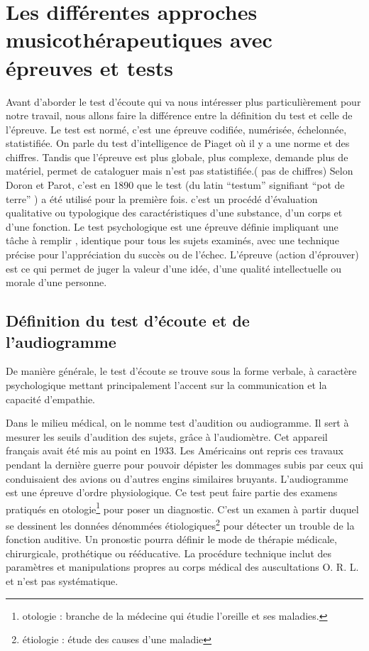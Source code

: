 \chapter{Les différentes approches musicothérapeutiques avec épreuves
  et tests}
Avant d'aborder le test d'écoute qui va nous intéresser plus
particulièrement pour notre travail, nous allons faire la différence
entre la définition du test et celle de l'épreuve.
Le test est normé, c'est une épreuve codifiée, numérisée, échelonnée,
statistifiée. On parle du test d'intelligence de Piaget où il y a une
norme et des chiffres. Tandis que l'épreuve est plus globale, plus complexe,
demande plus de matériel, permet de
cataloguer mais n'est pas statistifiée.( pas de chiffres)
Selon Doron et Parot, c'est en 1890 que le test (du latin ``testum''
signifiant ``pot de terre'' ) a été utilisé pour la
première fois. c'est un procédé d'évaluation qualitative ou
typologique des caractéristiques d'une substance, d'un corps et d'une
fonction.
Le test psychologique est une épreuve définie impliquant une tâche à
remplir , identique pour tous les sujets examinés, avec une technique
précise pour l'appréciation du succès ou de l'échec.
L'épreuve (action d'éprouver) est ce qui permet de juger la valeur
d'une idée, d'une qualité intellectuelle ou morale d'une personne.

\section{Définition du test d'écoute et de l'audiogramme}

De manière générale, le test d'écoute se trouve sous la forme verbale,
à caractère  
psychologique mettant principalement l'accent sur la communication
et la capacité d'empathie.

Dans le milieu médical, on le nomme test d'audition ou audiogramme. Il
sert à mesurer les seuils d'audition des sujets, grâce à l'audiomètre. Cet 
appareil français avait été mis au point en 1933. Les Américains
ont repris ces travaux pendant la dernière guerre pour pouvoir dépister
les dommages subis par ceux qui conduisaient des avions ou d'autres
engins similaires bruyants.
  L'audiogramme est une épreuve d'ordre physiologique. Ce test peut faire partie des examens  pratiqués en otologie\footnote{otologie : branche de la médecine
  	qui étudie l'oreille et ses maladies.} pour poser un diagnostic. 
   C'est un examen à partir duquel se
  dessinent les données dénommées étiologiques\footnote{étiologie : étude des causes
  	d'une maladie} pour détecter un trouble de la fonction auditive. Un pronostic pourra définir le mode de thérapie
médicale, chirurgicale, prothétique ou rééducative. La procédure
technique inclut des paramètres et manipulations propres au corps
médical des auscultations O. R. L. et  n'est pas systématique.






